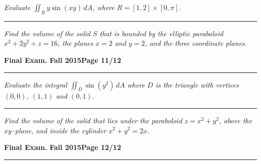 \documentclass[12pt]{article}
\begin{document}
\bigskip
{\problem[5 pts] \em  Evaluate $\iint_R y \sin(xy)\, dA$, where
  $R=[1,2] \times [0,\pi]$.}
\vspace{8cm}
\begin{flushright}
\end{flushright}
\hrule
{\problem[5 pts] \em Find the volume of the solid $S$ that is bounded
  by the elliptic paraboloid $x^2+2y^2+z=16$, the planes $x=2$ and
  $y=2$, and the three coordinate planes.}
\vspace{9cm}
\begin{flushright}
\end{flushright}
\newpage

\hfill{\large\bf Final Exam.}\hfill{\large\bf
  Fall 2015}\hfill{\large\bf Page 11/12}\hrule

\bigskip
{\problem[5 pts] \em Evaluate the integral $\iint_D \sin(y^2)\, dA$
  where $D$ is the triangle with vertices $(0,0)$, $(1,1)$ and
  $(0,1)$.}
\vspace{8cm}
\begin{flushright}
\end{flushright}
\hrule
{\problem[5 pts] \em Find the volume of the solid that lies under the
  paraboloid $z=x^2+y^2$, above the $xy$--plane, and inside the
  cylinder $x^2+y^2=2x$.}
\vspace{8cm}
\begin{flushright}
\end{flushright}
\newpage

\hfill{\large\bf Final Exam.}\hfill{\large\bf
  Fall 2015}\hfill{\large\bf Page 12/12}\hrule
\end{document}
